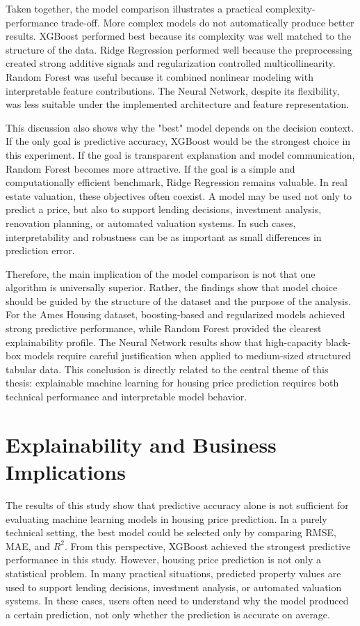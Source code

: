 \documentclass[12pt,a4paper,oneside,openany]{book}
\begin{document}
Taken together, the model comparison illustrates a practical complexity-performance trade-off. More complex models do not automatically produce better results. XGBoost performed best because its complexity was well matched to the structure of the data. Ridge Regression performed well because the preprocessing created strong additive signals and regularization controlled multicollinearity. Random Forest was useful because it combined nonlinear modeling with interpretable feature contributions. The Neural Network, despite its flexibility, was less suitable under the implemented architecture and feature representation.

This discussion also shows why the "best" model depends on the decision context. If the only goal is predictive accuracy, XGBoost would be the strongest choice in this experiment. If the goal is transparent explanation and model communication, Random Forest becomes more attractive. If the goal is a simple and computationally efficient benchmark, Ridge Regression remains valuable. In real estate valuation, these objectives often coexist. A model may be used not only to predict a price, but also to support lending decisions, investment analysis, renovation planning, or automated valuation systems. In such cases, interpretability and robustness can be as important as small differences in prediction error.

Therefore, the main implication of the model comparison is not that one algorithm is universally superior. Rather, the findings show that model choice should be guided by the structure of the dataset and the purpose of the analysis. For the Ames Housing dataset, boosting-based and regularized models achieved strong predictive performance, while Random Forest provided the clearest explainability profile. The Neural Network results show that high-capacity black-box models require careful justification when applied to medium-sized structured tabular data. This conclusion is directly related to the central theme of this thesis: explainable machine learning for housing price prediction requires both technical performance and interpretable model behavior.


\section{Explainability and Business Implications}

The results of this study show that predictive accuracy alone is not sufficient for evaluating machine learning models in housing price prediction. In a purely technical setting, the best model could be selected only by comparing RMSE, MAE, and $R^2$. From this perspective, XGBoost achieved the strongest predictive performance in this study. However, housing price prediction is not only a statistical problem. In many practical situations, predicted property values are used to support lending decisions, investment analysis, or automated valuation systems. In these cases, users often need to understand why the model produced a certain prediction, not only whether the prediction is accurate on average.
\end{document}
